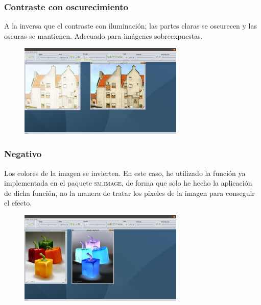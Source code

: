 \documentclass[11pt,a4paper]{article}
\begin{document}
\subsubsection{Contraste con oscurecimiento}
A la inversa que el contraste con iluminación; las partes claras se oscurecen y las oscuras se mantienen. Adecuado para imágenes sobreexpuestas.

\begin{figure}[H]
\centering
	\includegraphics[width=0.7\textwidth]{img/conoscu.png}
\end{figure}

\subsubsection{Negativo}
Los colores de la imagen se invierten. En este caso, he utilizado la función ya implementada en el paquete \textsc{sm.image}, de forma que solo he hecho la aplicación de dicha función, no la manera de tratar los pixeles de la imagen para conseguir el efecto.

\begin{figure}[H]
\centering
	\includegraphics[width=0.7\textwidth]{img/negativo.png}
\end{figure}
\end{document}
